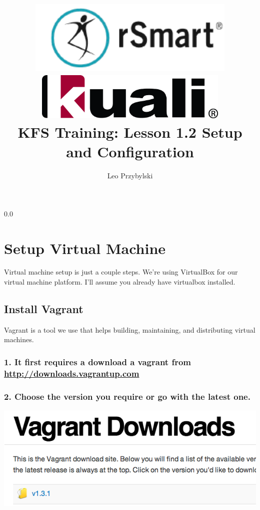 \documentclass[12pt,notitlepage]{article}
\author{Leo Przybylski}
\title{\includegraphics[width=0.75\textwidth]{../img/rsmart_base.png}\\\includegraphics[width=0.70\textwidth]{../img/kuali_base.png}\\KFS Training: Lesson 1.2 Setup and Configuration}
\begin{document}
\maketitle
\tableofcontents
{}
{\setlength{\baselineskip}%
  {0.0\baselineskip}
  \section*{\flushright Setup Virtual Machine}
  \hrulefill \par}
 Virtual machine setup is just a couple steps. We're using VirtualBox for our virtual machine platform. I'll assume you already have virtualbox installed.

\subsection{Install Vagrant}
Vagrant is a tool we use that helps building, maintaining, and distributing virtual machines.

\subsubsection*{1.  It first requires a download a vagrant from \url{http://downloads.vagrantup.com}}

\subsubsection*{2. Choose the version you require or go with the latest one.}
\includegraphics[width=\textwidth]{screenshots/Lesson1_2SS1.png}
\end{document}
